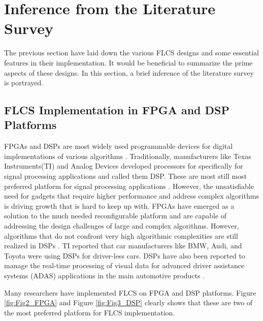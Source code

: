\section{Inference from the Literature Survey}
The previous section have laid down the various FLCS designs and some essential features in their implementation. It would be beneficial to summarize the prime aspects of these designs. In this section, a brief inference of the literature survey is portrayed.
\subsection{FLCS Implementation in FPGA and DSP Platforms}
FPGAs and DSPs are most widely used programmable devices for digital implementations of various algorithms \cite{Jinghong2007,Buccella2012,Bilsby1998}. Traditionally, manufacturers like Texas Instruments(TI) and Analog Devices developed processors for specifically for signal processing applications and called them DSP. These are most still most preferred platform for signal processing applications \cite{Lall2002Xilinx}. However, the unsatisfiable need for gadgets that require higher performance and address complex algorithms is driving growth that is hard to keep up with. FPGAs have emerged as a solution to the much needed reconfigurable platform and are capable of addressing the design challenges of large and complex algorithms. However, algorithms that do not confront very high algorithmic complexities are still realized in DSPs \cite{Lall2002Xilinx,Adams2002wp}. TI reported that car manufacturers like BMW, Audi, and Toyota were using DSPs for driver\hyp{}less cars. DSPs have also been reported to manage the real-time processing of visual data for advanced driver assistance systems (ADAS) applications in the main automotive products \cite{Schneiderman2014}.

Many researchers have implemented FLCS on FPGA and DSP platforms. Figure \ref{fig:Fig2_FPGA} and Figure \ref{fig:Fig3_DSP} clearly shows that these are two of the most preferred platform for FLCS implementation.

